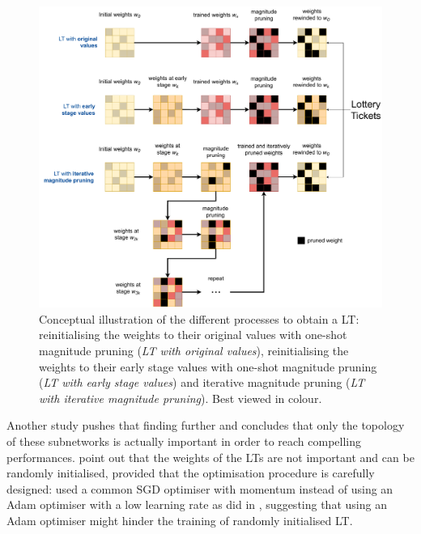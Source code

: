 \begin{figure}[htbp]
  \centering
  \includegraphics[width=\textwidth]{chapter_2/assets/LT_schemes.pdf}
  \caption{Conceptual illustration of the different processes to obtain a
  \acl{LT}: reinitialising the weights to their original values with one-shot
  magnitude pruning (\emph{LT with original values}), reinitialising the weights
  to their early stage values with one-shot magnitude pruning (\emph{LT with
  early stage values}) and iterative magnitude pruning (\emph{LT with iterative
  magnitude pruning}). Best viewed in colour.}
  \label{fig:chap2:lt_schemes}
\end{figure}

Another study \cite{DBLP:conf/iclr/LiuSZHD19} pushes that finding further and
concludes that only the topology of these subnetworks is actually important in
order to reach compelling performances. \citeauthor{DBLP:conf/iclr/LiuSZHD19}
\cite{DBLP:conf/iclr/LiuSZHD19} point out that the weights of the \acp{LT} are
not important and can be randomly initialised, provided that the optimisation
procedure is carefully designed: \citeauthor{DBLP:conf/iclr/LiuSZHD19} used a
common \ac{SGD} optimiser with momentum instead of using an Adam optimiser
\cite{kingma2014adam} with a low learning rate as
\citeauthor{DBLP:conf/iclr/FrankleC19} did in \cite{DBLP:conf/iclr/FrankleC19},
suggesting that using an Adam optimiser might hinder the training of randomly
initialised \ac{LT}.\\


